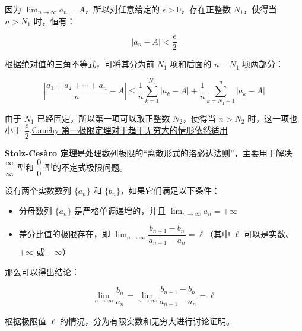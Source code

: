 因为 $\displaystyle \lim_{n \to \infty} a_n = A$，所以对任意给定的 $\displaystyle \epsilon > 0$，存在正整数 $\displaystyle N_1$，使得当 $\displaystyle n > N_1$ 时，恒有：

$$
\displaystyle \vert a_n - A \vert < \dfrac{\epsilon}{2}
$$

根据绝对值的三角不等式，可将其分为前 $\displaystyle N_1$ 项和后面的 $\displaystyle n - N_1$ 项两部分：

$$
\displaystyle \left\vert \dfrac{a_1 + a_2 + \cdots + a_n}{n} - A \right\vert \le \dfrac{1}{n} \sum_{k=1}^{N_1} \vert a_k - A \vert + \dfrac{1}{n} \sum_{k=N_1+1}^n \vert a_k - A \vert
$$

由于 $\displaystyle N_1$ 已经固定，所以第一项可以取正整数 $\displaystyle N_2$，使得当 $\displaystyle n > N_2$ 时，这一项也小于 $\dfrac{\epsilon}{2}$.\uline{Cauchy 第一极限定理对于趋于无穷大的情形依然适用}

\textbf{Stolz-Cesàro 定理}是处理数列极限的“离散形式的洛必达法则”，主要用于解决 $\displaystyle\dfrac{\infty}{\infty}$ 型和 $\displaystyle\dfrac{0}{0}$ 型的不定式极限问题。

\begin{theorem}

\label{Stolzoo}设有两个实数数列 $\displaystyle\lbrace a_n \displaystyle\rbrace$ 和 $\displaystyle\lbrace b_n \displaystyle\rbrace$，如果它们满足以下条件：

\begin{itemize}
  \item {分母数列 $\displaystyle\lbrace a_n \displaystyle\rbrace$ 是严格单调递增的，并且 $\displaystyle\lim_{n \to \infty} a_n = +\infty$}\item {差分比值的极限存在，即 $\displaystyle\lim_{n \to \infty} \displaystyle\dfrac{b_{n+1} - b_n}{a_{n+1} - a_n} = \ell$（其中 $\ell$ 可以是实数、$+\infty$ 或 $-\infty$）}
\end{itemize}

那么可以得出结论：

\begin{equation}\displaystyle\lim_{n \to \infty}\displaystyle\dfrac{b_n}{a_n} =\lim_{n \to \infty} \dfrac{b_{n+1} - b_n}{a_{n+1} - a_n} = \ell\end{equation}

\end{theorem}

根据极限值 $\displaystyle \ell$ 的情况，分为有限实数和无穷大进行讨论证明。

